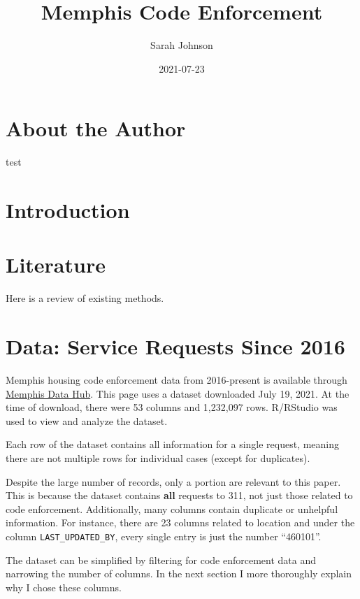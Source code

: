 \documentclass[
]{book}
\title{Memphis Code Enforcement}
\author{Sarah Johnson}
\date{2021-07-23}
\begin{document}
\maketitle

{
\setcounter{tocdepth}{1}
\tableofcontents
}
\hypertarget{about-the-author}{%
\chapter{About the Author}\label{about-the-author}}

test

\hypertarget{intro}{%
\chapter{Introduction}\label{intro}}

\hypertarget{literature}{%
\chapter{Literature}\label{literature}}

Here is a review of existing methods.

\hypertarget{data-service-requests-since-2016}{%
\chapter{Data: Service Requests Since 2016}\label{data-service-requests-since-2016}}

Memphis housing code enforcement data from 2016-present is available through \href{https://data.memphistn.gov/dataset/Service-Requests-since-2016/hmd4-ddta}{Memphis Data Hub}. This page uses a dataset downloaded July 19, 2021. At the time of download, there were 53 columns and 1,232,097 rows. R/RStudio was used to view and analyze the dataset.

Each row of the dataset contains all information for a single request, meaning there are not multiple rows for individual cases (except for duplicates).

Despite the large number of records, only a portion are relevant to this paper. This is because the dataset contains \textbf{all} requests to 311, not just those related to code enforcement. Additionally, many columns contain duplicate or unhelpful information. For instance, there are 23 columns related to location and under the column \texttt{LAST\_UPDATED\_BY}, every single entry is just the number ``460101''.

The dataset can be simplified by filtering for code enforcement data and narrowing the number of columns. In the next section I more thoroughly explain why I chose these columns.
\end{document}
